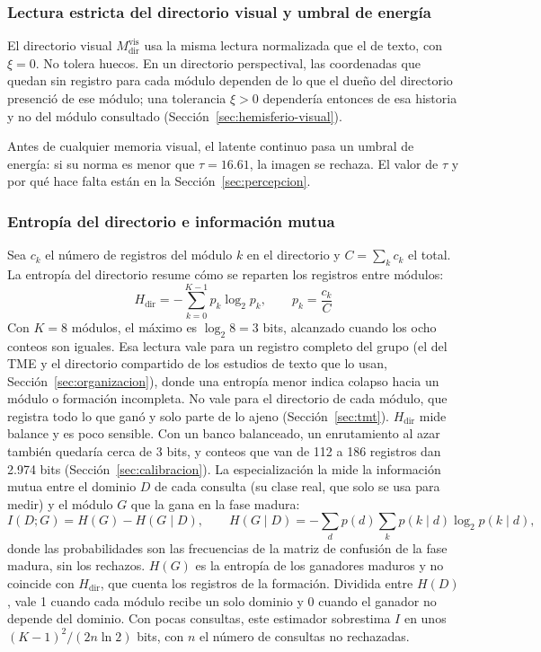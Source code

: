 \subsubsection*{Lectura estricta del directorio visual y umbral de energía}

El directorio visual $M^{\mathrm{vis}}_{\mathrm{dir}}$ usa la misma lectura normalizada que el de texto, con
$\xi = 0$.
No tolera huecos.
En un directorio perspectival, las coordenadas que quedan sin registro para cada módulo
dependen de lo que el dueño del directorio presenció de ese módulo; una tolerancia
$\xi > 0$ dependería entonces de esa historia y no del módulo consultado
(Sección~\ref{sec:hemisferio-visual}).

Antes de cualquier memoria visual, el latente continuo pasa un umbral de energía: si su
norma es menor que $\tau = 16.61$, la imagen se rechaza.
El valor de $\tau$ y por qué hace falta están en la Sección~\ref{sec:percepcion}.

\subsubsection*{Entropía del directorio e información mutua}

Sea $c_k$ el número de registros del módulo $k$ en el directorio y
$C = \sum_k c_k$ el total.
La entropía del directorio resume cómo se reparten los registros entre módulos:
\begin{equation}
    H_{\mathrm{dir}} = -\sum_{k=0}^{K-1} p_k \log_2 p_k, \qquad p_k = \frac{c_k}{C}
    \label{eq:entropia-dir}
\end{equation}
Con $K=8$ módulos, el máximo es $\log_2 8 = 3$ bits, alcanzado cuando los ocho conteos
son iguales.
Esa lectura vale para un registro completo del grupo (el del TME y el directorio
compartido de los estudios de texto que lo usan, Sección~\ref{sec:organizacion}), donde
una entropía menor indica colapso hacia un módulo o formación incompleta.
No vale para el directorio de cada módulo, que registra todo lo que ganó y solo parte
de lo ajeno (Sección~\ref{sec:tmt}).
$H_{\mathrm{dir}}$ mide balance y es poco sensible.
Con un banco balanceado, un enrutamiento al azar también quedaría cerca de 3 bits, y
conteos que van de 112 a 186 registros dan 2.974 bits (Sección~\ref{sec:calibracion}).
La especialización la mide la información mutua entre el dominio $D$ de cada consulta
(su clase real, que solo se usa para medir) y el módulo $G$ que la gana en la fase
madura:
\begin{equation}
    I(D; G) = H(G) - H(G \mid D), \qquad
    H(G \mid D) = -\sum_{d} p(d) \sum_{k} p(k \mid d) \log_2 p(k \mid d),
    \label{eq:info-mutua-dir}
\end{equation}
donde las probabilidades son las frecuencias de la matriz de confusión de la fase
madura, sin los rechazos.
$H(G)$ es la entropía de los ganadores maduros y no coincide con $H_{\mathrm{dir}}$, que
cuenta los registros de la formación.
Dividida entre $H(D)$, vale 1 cuando cada módulo recibe un solo dominio y 0 cuando el
ganador no depende del dominio.
Con pocas consultas, este estimador sobrestima $I$ en unos $(K-1)^2/(2n\ln 2)$ bits, con
$n$ el número de consultas no rechazadas.


